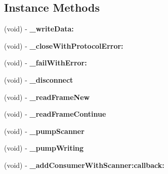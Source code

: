 \subsection*{Instance Methods}
\begin{DoxyCompactItemize}
\item 
\hypertarget{category_s_r_web_socket_07_08_ada16e1f26b0fc35a2b409b6bf8c6f81c}{(void) -\/ {\bfseries \-\_\-write\-Data\-:}}\label{category_s_r_web_socket_07_08_ada16e1f26b0fc35a2b409b6bf8c6f81c}

\item 
\hypertarget{category_s_r_web_socket_07_08_aebae0a3f7caa055aaafa786b1d105e7c}{(void) -\/ {\bfseries \-\_\-close\-With\-Protocol\-Error\-:}}\label{category_s_r_web_socket_07_08_aebae0a3f7caa055aaafa786b1d105e7c}

\item 
\hypertarget{category_s_r_web_socket_07_08_ad4807cf8e66e874797f815c74614a2cc}{(void) -\/ {\bfseries \-\_\-fail\-With\-Error\-:}}\label{category_s_r_web_socket_07_08_ad4807cf8e66e874797f815c74614a2cc}

\item 
\hypertarget{category_s_r_web_socket_07_08_adc6f94392b3ee3bb3f83de45fa3a0edc}{(void) -\/ {\bfseries \-\_\-disconnect}}\label{category_s_r_web_socket_07_08_adc6f94392b3ee3bb3f83de45fa3a0edc}

\item 
\hypertarget{category_s_r_web_socket_07_08_a77754365eefd5d853548bc4b55642bc2}{(void) -\/ {\bfseries \-\_\-read\-Frame\-New}}\label{category_s_r_web_socket_07_08_a77754365eefd5d853548bc4b55642bc2}

\item 
\hypertarget{category_s_r_web_socket_07_08_a59990979e0df48a55c64e3343efc123f}{(void) -\/ {\bfseries \-\_\-read\-Frame\-Continue}}\label{category_s_r_web_socket_07_08_a59990979e0df48a55c64e3343efc123f}

\item 
\hypertarget{category_s_r_web_socket_07_08_ae024bb34cb26e26428d2f80d384ddebb}{(void) -\/ {\bfseries \-\_\-pump\-Scanner}}\label{category_s_r_web_socket_07_08_ae024bb34cb26e26428d2f80d384ddebb}

\item 
\hypertarget{category_s_r_web_socket_07_08_a78f09c57e4e67de37e84a3079a0c90b5}{(void) -\/ {\bfseries \-\_\-pump\-Writing}}\label{category_s_r_web_socket_07_08_a78f09c57e4e67de37e84a3079a0c90b5}

\item 
\hypertarget{category_s_r_web_socket_07_08_a0067fa04a7fd60591df0452f76c6faca}{(void) -\/ {\bfseries \-\_\-add\-Consumer\-With\-Scanner\-:callback\-:}}\label{category_s_r_web_socket_07_08_a0067fa04a7fd60591df0452f76c6faca}


\end{DoxyCompactItemize}
